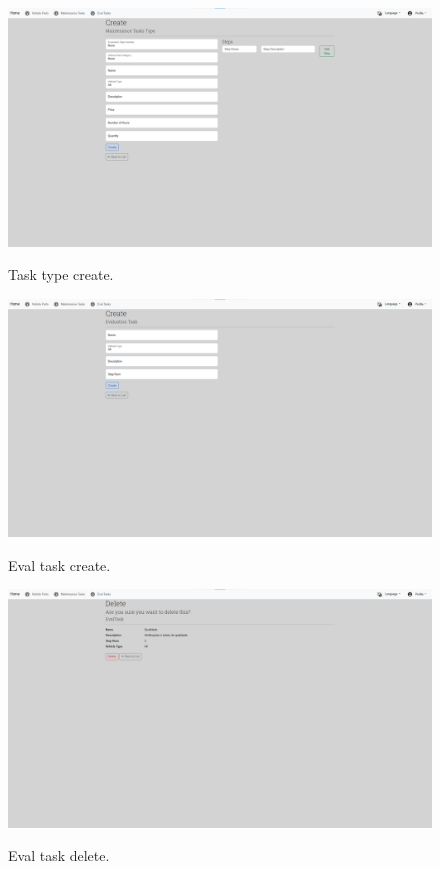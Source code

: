\begin{figure}[htbp]
  \caption{Task type create.}
  \centering
  \includegraphics[width=\textwidth]{figs/Implementation/dealershipAdmin/taskCreate}
  \label{fig:taskCreate}
\end{figure}


\begin{figure}[htbp]
  \caption{Eval task create.}
  \centering
  \includegraphics[width=\textwidth]{figs/Implementation/dealershipAdmin/evalCreate}
  \label{fig:evalCreate}
\end{figure}

\begin{figure}[htbp]
  \caption{Eval task delete.}
  \centering
  \includegraphics[width=\textwidth]{figs/Implementation/dealershipAdmin/evalDelete}
  \label{fig:evalDelete}
\end{figure}

